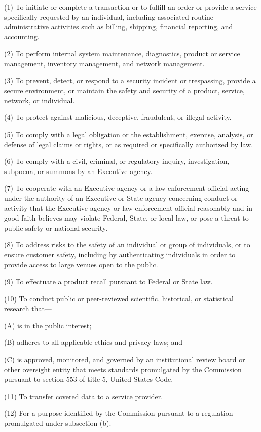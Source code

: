 (1) To initiate or complete a transaction or to fulfill an order or provide a service specifically requested by an individual, including associated routine administrative activities such as billing, shipping, financial reporting, and accounting.

(2) To perform internal system maintenance, diagnostics, product or service management, inventory management, and network management.

(3) To prevent, detect, or respond to a security incident or trespassing, provide a secure environment, or maintain the safety and security of a product, service, network, or individual.

(4) To protect against malicious, deceptive, fraudulent, or illegal activity.

(5) To comply with a legal obligation or the establishment, exercise, analysis, or defense of legal claims or rights, or as required or specifically authorized by law.

(6) To comply with a civil, criminal, or regulatory inquiry, investigation, subpoena, or summons by an Executive agency.

(7) To cooperate with an Executive agency or a law enforcement official acting under the authority of an Executive or State agency concerning conduct or activity that the Executive agency or law enforcement official reasonably and in good faith believes may violate Federal, State, or local law, or pose a threat to public safety or national security.

(8) To address risks to the safety of an individual or group of individuals, or to ensure customer safety, including by authenticating individuals in order to provide access to large venues open to the public.

(9) To effectuate a product recall pursuant to Federal or State law.

(10) To conduct public or peer-reviewed scientific, historical, or statistical research that—

(A) is in the public interest;

(B) adheres to all applicable ethics and privacy laws; and

(C) is approved, monitored, and governed by an institutional review board or other oversight entity that meets standards promulgated by the Commission pursuant to section 553 of title 5, United States Code.

(11) To transfer covered data to a service provider.

(12) For a purpose identified by the Commission pursuant to a regulation promulgated under subsection (b).

